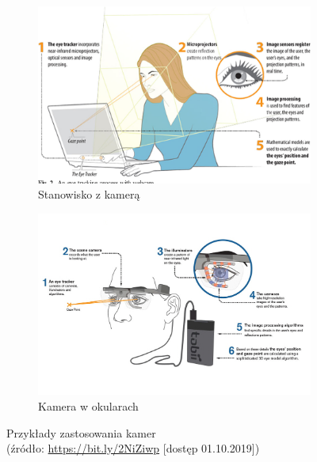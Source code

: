 \begin{figure}[H]
    \centering
    \begin{subfigure}{.5\textwidth}
      \centering
      \includegraphics[width=\linewidth]{resources/camera.png}
      \caption{Stanowisko z kamerą}
      \label{fig:camerassub1}
    \end{subfigure}%
    \begin{subfigure}{.5\textwidth}
      \centering
      \includegraphics[width=\linewidth]{resources/glasses.jpg}
      \caption{Kamera w okularach}
      \label{fig:camerassub2}
    \end{subfigure}
    \caption[Przykłady zastosowania kamer]{Przykłady zastosowania kamer\\
    \small(źródło: \url{https://bit.ly/2NiZiwp} [dostęp 01.10.2019])}
    \label{fig:cameras}
\end{figure}
